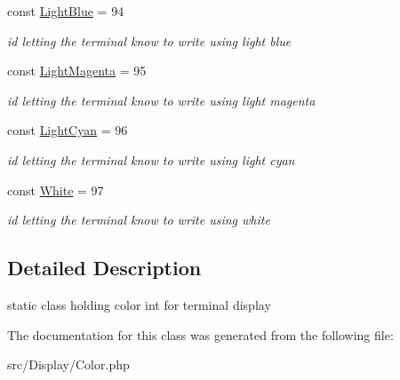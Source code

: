 \begin{DoxyCompactItemize}
const \hyperlink{classDisplay_1_1Color_a2e01836e6c626de1fba9da114c6ec727}{Light\+Blue} = 94
\begin{DoxyCompactList}\small\item\em id letting the terminal know to write using light blue \end{DoxyCompactList}\item 
\mbox{\label{classDisplay_1_1Color_a3ac22ad612cbcc41c0a67708b920bbe8}} 
const \hyperlink{classDisplay_1_1Color_a3ac22ad612cbcc41c0a67708b920bbe8}{Light\+Magenta} = 95
\begin{DoxyCompactList}\small\item\em id letting the terminal know to write using light magenta \end{DoxyCompactList}\item 
\mbox{\label{classDisplay_1_1Color_a7e5ed177ee2f35031535e56281660ac4}} 
const \hyperlink{classDisplay_1_1Color_a7e5ed177ee2f35031535e56281660ac4}{Light\+Cyan} = 96
\begin{DoxyCompactList}\small\item\em id letting the terminal know to write using light cyan \end{DoxyCompactList}\item 
\mbox{\label{classDisplay_1_1Color_aa1e0bc8eacc7a1430e5e408f8f569bbb}} 
const \hyperlink{classDisplay_1_1Color_aa1e0bc8eacc7a1430e5e408f8f569bbb}{White} = 97
\begin{DoxyCompactList}\small\item\em id letting the terminal know to write using white \end{DoxyCompactList}\end{DoxyCompactItemize}


\subsection{Detailed Description}
static class holding color int for terminal display 

The documentation for this class was generated from the following file\+:\begin{DoxyCompactItemize}
\item 
src/\+Display/Color.\+php\end{DoxyCompactItemize}
